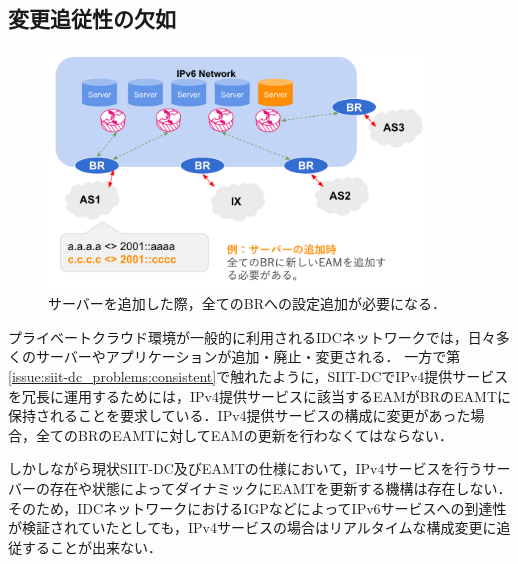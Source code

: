 \subsection{変更追従性の欠如}

\begin{figure}[h]
    \begin{center}
      \includegraphics[width=10cm,pagebox=cropbox,clip]{img/siit-dc_add-server.png}
    \end{center}
    \caption{サーバーを追加した際，全てのBRへの設定追加が必要になる．}
    \label{fig:siit-dc_add-server}
\end{figure}

プライベートクラウド環境が一般的に利用されるIDCネットワークでは，日々多くのサーバーやアプリケーションが追加・廃止・変更される．
一方で第\ref{issue:siit-dc_problems:consistent}で触れたように，SIIT-DCでIPv4提供サービスを冗長に運用するためには，IPv4提供サービスに該当するEAMがBRのEAMTに保持されることを要求している．IPv4提供サービスの構成に変更があった場合，全てのBRのEAMTに対してEAMの更新を行わなくてはならない．

しかしながら現状SIIT-DC及びEAMTの仕様\cite{RFC7755,RFC7756,RFC7757}において，IPv4サービスを行うサーバーの存在や状態によってダイナミックにEAMTを更新する機構は存在しない．そのため，IDCネットワークにおけるIGPなどによってIPv6サービスへの到達性が検証されていたとしても，IPv4サービスの場合はリアルタイムな構成変更に追従することが出来ない．



